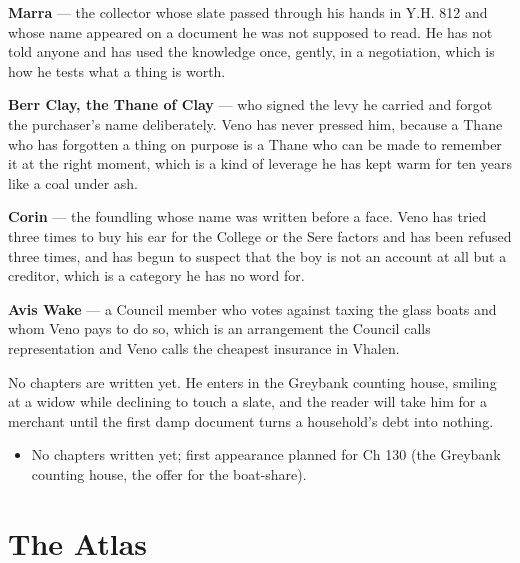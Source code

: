 \documentclass{design/chronicle}
\begin{document}
{\textbf{Marra} — the collector whose slate passed through his hands in Y.H. 812 and whose name appeared on a document he was not supposed to read. He has not told anyone and has used the knowledge once, gently, in a negotiation, which is how he tests what a thing is worth.

\textbf{Berr Clay, the Thane of Clay} — who signed the levy he carried and forgot the purchaser’s name deliberately. Veno has never pressed him, because a Thane who has forgotten a thing on purpose is a Thane who can be made to remember it at the right moment, which is a kind of leverage he has kept warm for ten years like a coal under ash.

\textbf{Corin} — the foundling whose name was written before a face. Veno has tried three times to buy his ear for the College or the Sere factors and has been refused three times, and has begun to suspect that the boy is not an account at all but a creditor, which is a category he has no word for.

\textbf{Avis Wake} — a Council member who votes against taxing the glass boats and whom Veno pays to do so, which is an arrangement the Council calls representation and Veno calls the cheapest insurance in Vhalen.

No chapters are written yet. He enters in the Greybank counting house, smiling at a widow while declining to touch a slate, and the reader will take him for a merchant until the first damp document turns a household’s debt into nothing.

\begin{itemize}[leftmargin=1.4em,itemsep=1pt,topsep=3pt,parsep=0pt]

\item No chapters written yet; first appearance planned for Ch 130 (the Greybank counting house, the offer for the boat-share).

\end{itemize}
}

\chapter*{The Atlas}
\end{document}
